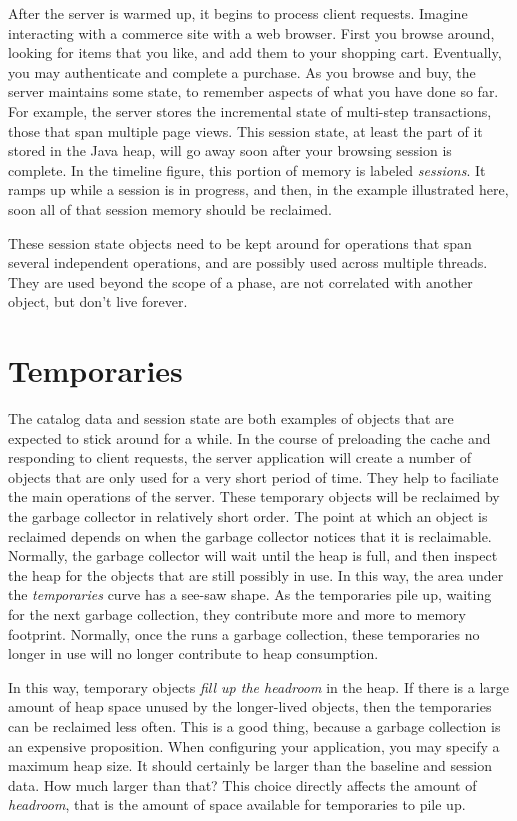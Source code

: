 After the server is warmed up, it begins to process client requests. Imagine
interacting with a commerce site with a web browser. First you browse around,
looking for items that you like, and add them to your shopping cart. Eventually,
you may authenticate and complete a purchase. As you browse and buy, the server
maintains some state, to remember aspects of what you have done so far. For
example, the server stores the incremental state of multi-step transactions,
those that span multiple page views. This session state, at least the part of it
stored in the Java heap, will go away soon after your browsing session is
complete. In the timeline figure, this portion of memory is labeled
\emph{sessions}. It ramps up while a session is in progress, and then, in the
example illustrated here, soon all of that session memory should be reclaimed.

These session state objects need to be kept around for operations that span
several independent operations, and are possibly used across multiple threads.
They are used beyond the scope of a phase, are not correlated with another
object, but don't live forever.


\section{Temporaries}
\label{sec:temporary-lifetime}

The catalog data and session state are both examples of objects that are expected
to stick around for a while. In the course of preloading the cache and responding
to client requests, the server application will create a number of objects that
are only used for a very short period of time.
They help to faciliate the main
operations of the server. These temporary objects will be reclaimed by the \jres
garbage collector in relatively short order. The point at which an object is
reclaimed depends on when the garbage collector notices that it is reclaimable.
Normally, the garbage collector will wait until the heap is full, and then
inspect the heap for the objects that are still possibly in use. In this way, the
area under the \emph{temporaries} curve has a see-saw shape. As the temporaries
pile up, waiting for the next garbage collection, they contribute more and more
to memory footprint. Normally, once the \jre runs a garbage collection, these
temporaries no longer in use will no longer contribute to heap consumption.

In this way, temporary objects
\emph{fill up the headroom} in the heap. If there is a
large amount of heap space unused by the longer-lived objects, then the
temporaries can be reclaimed less often. This is a good thing, because a
garbage collection is an expensive proposition.
   When configuring your application, you may specify a maximum heap size.
It should certainly be larger than the baseline and session data. How much
larger than that? This choice directly affects the amount of \emph{headroom},
 that is the amount of space available for temporaries to pile up.

